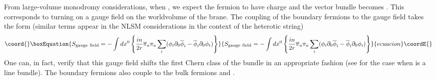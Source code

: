 \documentclass[a4paper,12pt]{article}
\begin{document}
{}From large-volume monodromy considerations, when \coordHE{},
we expect the fermion to have charge \coordHE{} and the vector 
bundle \coordHE{} becomes \coordHE{}. This corresponds to
turning on a \coordHE{}
gauge field on the worldvolume of the brane. The 
coupling of the boundary fermions to the gauge field
takes the form (similar terms appear in the NLSM 
considerations in the context of the heterotic string\cite{callanreview})
\begin{equation}\coord{}\boxEquation{
S_{\rm gauge~field}= -\int dx^0\left\{ {{in}\over{2 r}} \overline{\pi}_a
\pi_a \sum_i (\phi_i \partial_0\overline{\phi}_i - \overline{\phi}_i
\partial_0 \phi_i) \right\}
}{
S_{\rm gauge~field}= -\int dx^0\left\{ {{in}\over{2 r}} \overline{\pi}_a
\pi_a \sum_i (\phi_i \partial_0\overline{\phi}_i - \overline{\phi}_i
\partial_0 \phi_i) \right\}
}{ecuacion}\coordE{}\end{equation}
One can, in fact,  verify that this gauge field shifts the first Chern
class of the bundle in an appropriate fashion (see \cite{HIV} for
the case when \coordHE{} is a line bundle). The boundary fermions 
also couple to the bulk fermions \coordHE{} and \coordHE{}.
\end{document}
